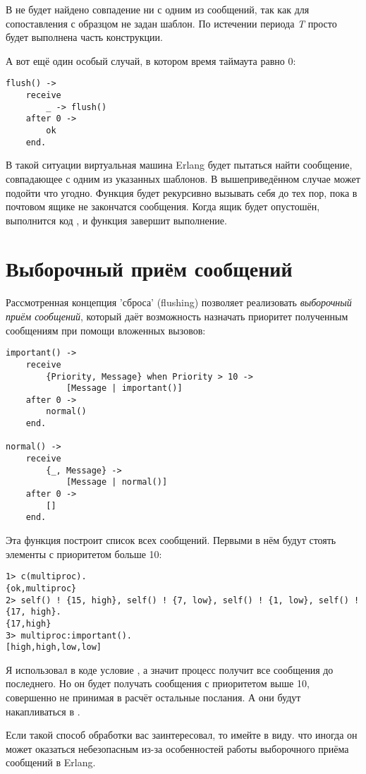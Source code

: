 В  не будет найдено совпадение ни с одним из сообщений, так как для сопоставления с образцом не задан шаблон.
По истечении периода \emph{T} просто будет выполнена  часть конструкции.

А вот ещё один особый случай, в котором время таймаута равно 0:
\begin{lstlisting}[style=erlang]
flush() ->
    receive
        _ -> flush()
    after 0 ->
        ok
    end.
\end{lstlisting}

В такой ситуации виртуальная машина Erlang будет пытаться найти сообщение, совпадающее с одним из указанных шаблонов.
В вышеприведённом случае может подойти что угодно.
Функция  будет рекурсивно вызывать себя до тех пор, пока в почтовом ящике не закончатся сообщения.
Когда ящик будет опустошён, выполнится код , и функция завершит выполнение.
\section{Выборочный приём сообщений}
Рассмотренная  концепция 'сброса' (flushing) позволяет реализовать \emph{выборочный приём сообщений}, который даёт возможность назначать приоритет полученным сообщениям при помощи вложенных вызовов:
\begin{lstlisting}[style=erlang]
important() ->
    receive
        {Priority, Message} when Priority > 10 ->
            [Message | important()]
    after 0 ->
        normal()
    end.
 
normal() ->
    receive
        {_, Message} ->
            [Message | normal()]
    after 0 ->
        []
    end.
\end{lstlisting}

Эта функция построит список всех сообщений.
Первыми в нём будут стоять элементы с приоритетом больше 10:
\begin{lstlisting}[style=erlang]
1> c(multiproc).
{ok,multiproc}
2> self() ! {15, high}, self() ! {7, low}, self() ! {1, low}, self() ! {17, high}.      
{17,high}
3> multiproc:important().
[high,high,low,low]
\end{lstlisting}

Я использовал в коде условие , а значит процесс получит все сообщения до последнего.
Но он будет получать сообщения с приоритетом выше 10, совершенно не принимая в расчёт остальные послания.
А они будут накапливаться в .

Если такой способ обработки вас заинтересовал, то имейте в виду. что иногда он может оказаться небезопасным из\--за особенностей работы выборочного приёма сообщений в Erlang.

